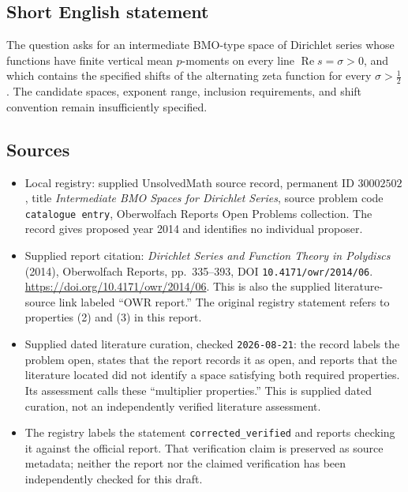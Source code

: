 \documentclass[11pt]{article}
\begin{document}
\subsection{Short English statement}
The question asks for an intermediate BMO-type space of Dirichlet series whose functions have finite vertical mean \(p\)-moments on every line \(\operatorname{Re}s=\sigma>0\), and which contains the specified shifts of the alternating zeta function for every \(\sigma>\tfrac12\). The candidate spaces, exponent range, inclusion requirements, and shift convention remain insufficiently specified.
\subsection{Sources}
\begin{itemize}
\item Local registry: supplied UnsolvedMath source record, permanent ID \(30002502\), title \emph{Intermediate BMO Spaces for Dirichlet Series}, source problem code \texttt{catalogue entry}, Oberwolfach Reports Open Problems collection. The record gives proposed year 2014 and identifies no individual proposer.
\item Supplied report citation: \emph{Dirichlet Series and Function Theory in Polydiscs} (2014), Oberwolfach Reports, pp.\ 335--393, DOI \texttt{10.4171/owr/2014/06}. \url{https://doi.org/10.4171/owr/2014/06}. This is also the supplied literature-source link labeled ``OWR report.'' The original registry statement refers to properties (2) and (3) in this report.
\item Supplied dated literature curation, checked \texttt{2026-08-21}: the record labels the problem open, states that the report records it as open, and reports that the literature located did not identify a space satisfying both required properties. Its assessment calls these ``multiplier properties.'' This is supplied dated curation, not an independently verified literature assessment.
\item The registry labels the statement \texttt{corrected\_verified} and reports checking it against the official report. That verification claim is preserved as source metadata; neither the report nor the claimed verification has been independently checked for this draft.
\end{itemize}
\end{document}
